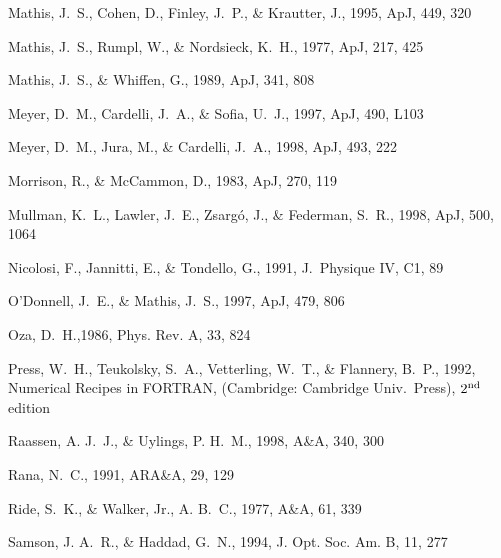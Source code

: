\documentclass{aastex}
\begin{document}
\begin{thebibliography}{}
Mathis, J.~S., Cohen, D., Finley, J.~P., \& Krautter, J.,  1995, ApJ, 449, 320

Mathis, J.~S., Rumpl, W., \& Nordsieck, K.~H.,  1977, ApJ, 217, 425

Mathis, J.~S., \& Whiffen, G.,  1989, ApJ, 341, 808

Meyer, D.~M., Cardelli, J.~A., \& Sofia, U.~J.,  1997, ApJ, 490, L103

Meyer, D.~M., Jura, M., \& Cardelli, J.~A.,  1998, ApJ, 493, 222

Morrison, R., \& {McCammon}, D.,  1983, ApJ, 270, 119

Mullman, K.~L., Lawler, J.~E., Zsarg\'o, J., \& Federman, S.~R., 1998,
ApJ, 500, 1064

Nicolosi, F., Jannitti, E., \& Tondello, G.,  1991, J.\ Physique IV, C1, 89

{O'Donnell}, J.~E., \& Mathis, J.~S.,  1997, ApJ, 479, 806

Oza, D.~H.,1986, Phys. Rev. A, 33, 824

Press, W.~H., Teukolsky, S.~A., Vetterling, W.~T., \& Flannery, B.~P.,  1992,
\newblock Numerical Recipes in {FORTRAN},
\newblock  (Cambridge: Cambridge Univ.\ Press), $2^{\mbox{\scriptsize nd}}$
  edition

Raassen, A. J.~J., \& Uylings, P. H.~M.,  1998, A\&A, 340, 300

Rana, N.~C., 1991, ARA\&A, 29, 129

Ride, S.~K., \& Walker, Jr., A. B.~C.,  1977, A\&A, 61, 339

Samson, J. A.~R., \& Haddad, G.~N.,  1994, J. Opt. Soc. Am. B, 11, 277


\end{thebibliography}
\end{document}
